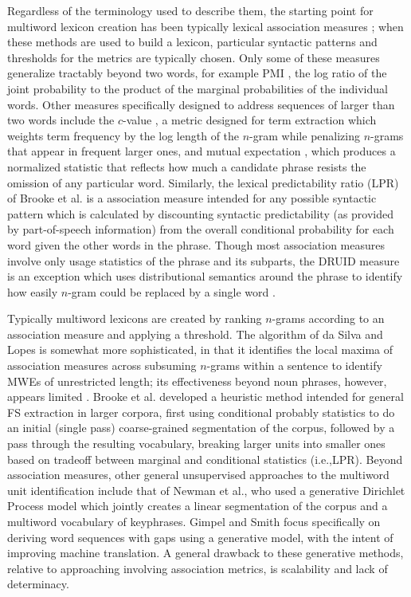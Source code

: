 \documentclass[11pt]{article}
\makeatletter
\def \ie {i.e.,\@ }
\def \al {al.\@ }
\makeatother
\begin{document}
Regardless of the terminology used to describe them, the starting point for multiword lexicon creation has been typically lexical association measures \cite{Church90,Dunning93,Schone01,Evert04,Pecina10,DeAraujo11,Kulkarni11,Ramisch14}; when these methods are used to build a lexicon, particular syntactic patterns and thresholds for the metrics are typically chosen. Only some of these measures generalize tractably beyond two words, for example PMI \cite{Church90}, the log ratio of the joint probability to the product of the marginal probabilities of the individual words. Other measures specifically designed to address sequences of larger than two words include the $c$-value \cite{Frantzi00}, a metric designed for term extraction which weights term frequency by the log length of the $n$-gram while penalizing $n$-grams that appear in frequent larger ones, and mutual expectation \cite{Dias99}, which produces a normalized statistic that reflects how much a candidate phrase resists the omission of any particular word. Similarly, the lexical predictability ratio (LPR) of Brooke et \al \cite{Brooke15b} is a association measure intended for any possible syntactic pattern which is calculated by discounting syntactic predictability (as provided by part-of-speech information) from the overall conditional probability for each word given the other words in the phrase. Though most association measures involve only usage statistics of the phrase and its subparts, the DRUID measure is an exception which uses distributional semantics around the phrase to identify how easily $n$-gram could be replaced by a single word \cite{Riedl15}.

Typically multiword lexicons are created by ranking $n$-grams according to an association measure and applying a threshold. The algorithm of da Silva and Lopes  is somewhat more sophisticated, in that it identifies the local maxima of association measures across subsuming $n$-grams within a sentence to identify MWEs of unrestricted length; its effectiveness beyond noun phrases, however, appears limited \cite{Ramisch12}. Brooke et \al {} developed a heuristic method intended for general FS extraction in larger corpora, first using conditional probably statistics to do an initial (single pass) coarse-grained segmentation of the corpus, followed by a pass through the resulting vocabulary, breaking larger units into smaller ones based on tradeoff between marginal and conditional statistics (\ie LPR). Beyond association measures, other general unsupervised approaches to the multiword unit identification include that of Newman et \al {}, who used a generative Dirichlet Process model which jointly creates a linear segmentation of the corpus and a multiword vocabulary of keyphrases. Gimpel and Smith  focus specifically on deriving word sequences with gaps using a generative model, with the intent of improving machine translation. A general drawback to these generative methods, relative to approaching involving association metrics, is scalability and lack of determinacy.
\end{document}
